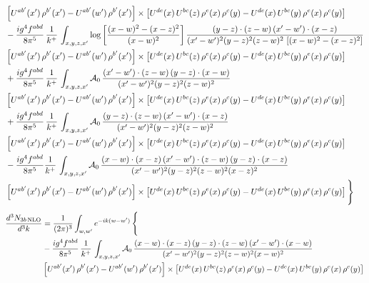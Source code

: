 \documentclass[10pt]{article}
\begin{document}
{\begin{align*}
& \left[U^{ab'}(x')\,\rho^{b'}(x')-U^{ab'}(w')\, \rho^{b'}(x')\right]\times \left[U^{de}(x)\,U^{bc}(z)\, \rho^{e}(x)\,\rho^{c}(y)-U^{de}(x)\,U^{bc}(y)\,\rho^{e}(x)\,\rho^{c}(y)\right] \notag \\
& -\frac{ig^{4}f^{abd}}{8\pi^{5}}\,\frac{1}{k^{+}}\,\int_{x,y,z,x'}\log{\left[\frac{(x-w)^{2}-(x-z)^{2}}{(x-w)^{2}}\right]}\,
\frac{(y-z)\cdot(z-w)\,(x'-w')\cdot(x-z)}{(x'-w')^{2}(y-z)^{2}(z-w)^{2}\,\left[(x-w)^{2}-(x-z)^{2}\right]}\notag \\ & \left[U^{ab'}(x')\,\rho^{b'}(x')-U^{ab'}(w')\, \rho^{b'}(x')\right]\times \left[U^{de}(x)\,U^{bc}(z)\, \rho^{e}(x)\,\rho^{c}(y)-U^{de}(x)\,U^{bc}(y)\,\rho^{e}(x)\,\rho^{c}(y)\right] \notag \\
& +\frac{ig^{4}f^{abd}}{8\pi^{5}}\,\frac{1}{k^{+}}\,\int_{x,y,z,x'}\mathcal{A}_{0}\,
\frac{(x'-w')\cdot(z-w)\,(y-z)\cdot(x-w)}{(x'-w')^{2}(y-z)^{2}(z-w)^{2}}\notag \\
& \left[U^{ab'}(x')\,\rho^{b'}(x')-U^{ab'}(w')\, \rho^{b'}(x')\right]\times \left[U^{de}(x)\,U^{bc}(z)\, \rho^{e}(x)\,\rho^{c}(y)-U^{de}(x)\,U^{bc}(y)\,\rho^{e}(x)\,\rho^{c}(y)\right] \notag \\
& +\frac{ig^{4}f^{abd}}{8\pi^{5}}\,\frac{1}{k^{+}}\,\int_{x,y,z,x'}\mathcal{A}_{0}\,
\frac{(y-z)\cdot(z-w)\,(x'-w')\cdot(x-z)}{(x'-w')^{2}(y-z)^{2}(z-w)^{2}}\notag \\ & \left[U^{ab'}(x')\,\rho^{b'}(x')-U^{ab'}(w')\, \rho^{b'}(x')\right]\times \left[U^{de}(x)\,U^{bc}(z)\, \rho^{e}(x)\,\rho^{c}(y)-U^{de}(x)\,U^{bc}(y)\,\rho^{e}(x)\,\rho^{c}(y)\right] \notag \\
& -\frac{ig^{4}f^{abd}}{8\pi^{5}}\frac{1}{k^{+}}\,\int_{x,y,z,x'}\mathcal{A}_{0}\,
\frac{(x-w)\cdot(x-z)\,(x'-w')\cdot(z-w)\,(y-z)\cdot(x-z)}{(x'-w')^{2}(y-z)^{2}(z-w)^{2}(x-z)^{2}}\notag \\ & \left[U^{ab'}(x')\,\rho^{b'}(x')-U^{ab'}(w')\, \rho^{b'}(x')\right]\times \left[U^{de}(x)\,U^{bc}(z)\, \rho^{e}(x)\,\rho^{c}(y)-U^{de}(x)\,U^{bc}(y)\,\rho^{e}(x)\,\rho^{c}(y)\right]\Bigg\}
\end{align*}
\begin{align*}
\frac{d^{3}N_{3b\,\rm NLO}}{d^{3}k} & = \frac{1}{(2\pi)^{3}}\int_{w,w'}e^{-ik(w-w')}\,\Bigg\{\notag \\
&-\frac{ig^{4}f^{abd}}{8\pi^{5}}\,\frac{1}{k^{+}}\,\int_{x,y,z,x'}\mathcal{A}_{0}\,
\frac{(x-w)\cdot(x-z)\,(y-z)\cdot(z-w)\,(x'-w')\cdot(x-w)}{(x'-w')^{2}(y-z)^{2}(z-w)^{2}(x-w)^{2}}\notag \\ & \left[U^{ab'}(x')\,\rho^{b'}(x')-U^{ab'}(w')\, \rho^{b'}(x')\right]\times \left[U^{de}(x)\,U^{bc}(z)\, \rho^{e}(x)\,\rho^{c}(y)-U^{de}(x)\,U^{bc}(y)\,\rho^{e}(x)\,\rho^{c}(y)\right] \notag \\

\end{align*}}
\end{document}
